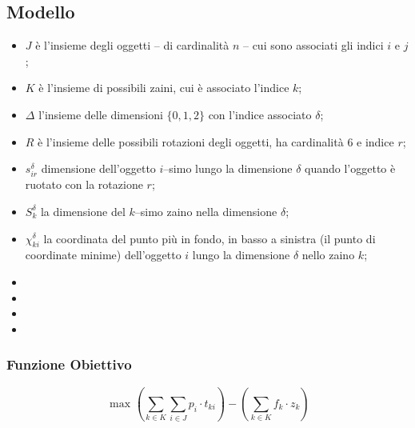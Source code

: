 \subsection{Modello}
\label{sec:modello:multi3BKP}
\begin{itemize}
	\item $J$ è l'insieme degli oggetti -- di cardinalità $n$ -- cui sono 
	associati gli indici $i$ e $j$;
	\item $K$ è l'insieme di possibili zaini, cui è associato l'indice $k$;
	\item $\Delta$ l'insieme delle dimensioni $\{0,1,2\}$ con l'indice associato
	$\delta$;
	\item $R$ è l'insieme delle possibili rotazioni degli oggetti, ha 
	cardinalità $6$ e indice $r$;
	\item $s_{ir}^\delta$ dimensione dell'oggetto $i$--simo lungo la dimensione
	$\delta$ quando l'oggetto è ruotato con la rotazione $r$;
	\item $S_{k}^\delta$ la dimensione del $k$--simo zaino nella dimensione 
	$\delta$;
	\item $\chi_{ki}^\delta$ la coordinata del punto più in fondo, in basso a 
	sinistra  (il punto di coordinate minime) dell'oggetto $i$ lungo la 
	dimensione $\delta$ nello zaino $k$;
	\item {}
	\item {}
	\item {}
	\item {}
	
\end{itemize}



\subsubsection{Funzione Obiettivo}
\begin{equation}
\text{ max }\left(\sum_{k \in K} \sum_{i \in J} p_i \cdot t_{ki}\right) - 
\left(\sum_{k \in K} f_k \cdot z_k\right)
\end{equation}


